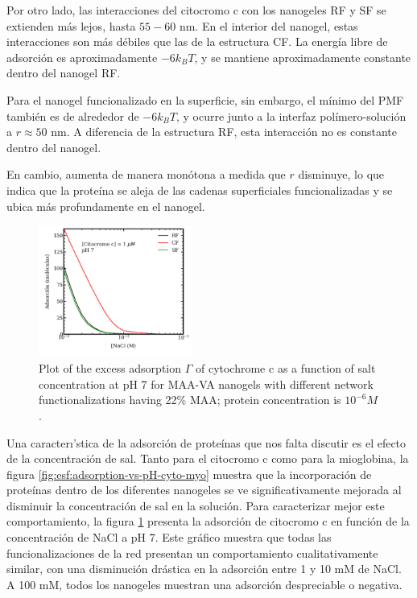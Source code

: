 Por otro lado, las interacciones del citocromo c con los nanogeles RF y SF se extienden m\'as lejos, hasta $55-60$ nm. En el interior del nanogel, estas interacciones son m\'as débiles que las de la estructura CF. La energ\'ia libre de adsorci\'on es aproximadamente $-6 k_BT$, y se mantiene aproximadamente constante dentro del nanogel RF.

Para el nanogel funcionalizado en la superficie, sin embargo, el m\'inimo del PMF tambi\'en es de alrededor de $-6 k_BT$, y ocurre junto a la interfaz pol\'imero-soluci\'on a $r\approx 50$ nm. A diferencia de la estructura RF, esta interacci\'on no es constante dentro del nanogel. 

En cambio, aumenta de manera mon\'otona a medida que $r$ disminuye, lo que indica que la prote\'ina se aleja de las cadenas superficiales funcionalizadas y se ubica m\'as profundamente en el nanogel.




\begin{figure}
     \centering
     \includegraphics[width=0.45\textwidth]{Figures/graphs-gel2/gamma-salts-cito.pdf}
     \caption{Plot of the excess adsorption $\Gamma$ of cytochrome c as a function of salt concentration at pH 7 for MAA-VA nanogels with different network functionalizations having 22\% MAA; protein concentration is $10^{-6}M$.}
     \label{fig:esf:adsorption-vs-salt-cyto}
 \end{figure}
 

Una caracter\i'stica de la adsorci\'on de prote\'inas que nos falta discutir es el efecto de la concentraci\'on de sal.
Tanto para el citocromo c como para la mioglobina, la figura \ref{fig:esf:adsorption-vs-pH-cyto-myo} muestra que la incorporaci\'on de prote\'inas dentro de los diferentes nanogeles se ve significativamente mejorada al disminuir la concentraci\'on de sal en la soluci\'on.
Para caracterizar mejor este comportamiento, la figura \ref{fig:esf:adsorption-vs-salt-cyto} presenta la adsorci\'on de citocromo c en funci\'on de la concentraci\'on de NaCl a pH 7.
Este gr\'afico muestra que todas las funcionalizaciones de la red presentan un comportamiento cualitativamente similar, con una disminuci\'on dr\'astica en la adsorci\'on entre 1 y 10 mM de NaCl.
A 100 mM, todos los nanogeles muestran una adsorci\'on despreciable o negativa.

